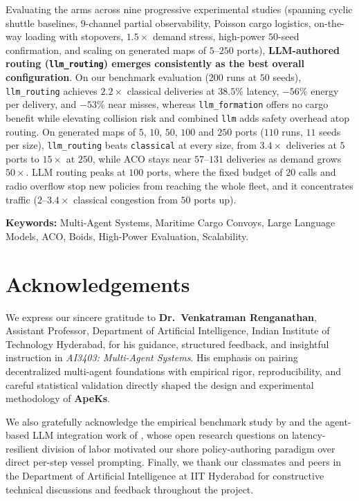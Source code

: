 \documentclass[11pt,a4paper,oneside]{report}
\newcommand{\RepInstructor}{Dr.\ Venkatraman Renganathan}
\begin{document}
Evaluating the arms across nine progressive experimental studies (spanning cyclic shuttle baselines, $9$-channel partial observability, Poisson cargo logistics, on-the-way loading with stopovers, $1.5\times$ demand stress, high-power $50$-seed confirmation, and scaling on generated maps of $5$--$250$ ports), \textbf{LLM-authored routing (\texttt{llm\_routing}) emerges consistently as the best overall configuration}. On our benchmark evaluation ($200$ runs at $50$ seeds), \texttt{llm\_routing} achieves $2.2\times$ classical deliveries at $38.5\%$ latency, $-56\%$ energy per delivery, and $-53\%$ near misses, whereas \texttt{llm\_formation} offers no cargo benefit while elevating collision risk and combined \texttt{llm} adds safety overhead atop routing. On generated maps of $5$, $10$, $50$, $100$ and $250$ ports ($110$ runs, $11$ seeds per size), \texttt{llm\_routing} beats \texttt{classical} at every size, from $3.4\times$ deliveries at $5$ ports to $15\times$ at $250$, while ACO stays near $57$--$131$ deliveries as demand grows $50\times$. LLM routing peaks at $100$ ports, where the fixed budget of $20$ calls and radio overflow stop new policies from reaching the whole fleet, and it concentrates traffic ($2$--$3.4\times$ classical congestion from $50$ ports up).

\vspace{0.5em}\noindent\textbf{Keywords:} Multi-Agent Systems, Maritime Cargo Convoys, Large Language Models, ACO, Boids, High-Power Evaluation, Scalability.

\clearpage
\chapter*{Acknowledgements}

We express our sincere gratitude to \textbf{\RepInstructor}, Assistant Professor, Department of Artificial Intelligence, Indian Institute of Technology Hyderabad, for his guidance, structured feedback, and insightful instruction in \textit{AI3403: Multi-Agent Systems}. His emphasis on pairing decentralized multi-agent foundations with empirical rigor, reproducibility, and careful statistical validation directly shaped the design and experimental methodology of \textbf{ApeKs}.

We also gratefully acknowledge the empirical benchmark study by \citet{Rahman2026} and the agent-based LLM integration work of \citet{JimenezRomero2025}, whose open research questions on latency-resilient division of labor motivated our shore policy-authoring paradigm over direct per-step vessel prompting. Finally, we thank our classmates and peers in the Department of Artificial Intelligence at IIT Hyderabad for constructive technical discussions and feedback throughout the project.
\end{document}
